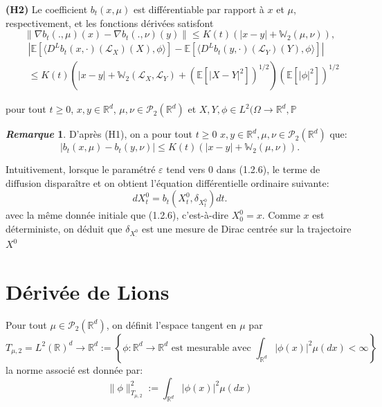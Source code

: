 \documentclass[12pt,a4paper,twoside]{book}%
\theoremstyle{definition}
\newtheorem{rem}{\textit{Remarque}}[section]
\numberwithin{equation}{section}
\begin{document}
\textbf{(H2)} Le coefficient $b_t(x, \mu)$ est différentiable par rapport à $x$ et $\mu$, respectivement, et les fonctions dérivées satisfont
\begin{equation}
	\|\nabla b_t(., \mu)(x) - \nabla b_t(., \nu)(y)\| \leq K(t)(|x - y| + \mathbb{W}_2(\mu, \nu)),
\end{equation}
\[
\begin{aligned}
	&\left| \mathbb{E}\left[ \langle D^L b_t(x, \cdot)(\mathcal{L}_X)(X), \phi \rangle \right] 
	- \mathbb{E}\left[ \langle D^L b_t(y, \cdot)(\mathcal{L}_Y)(Y), \phi \rangle \right] \right| \\
	&\leq K(t)\left( |x - y| + \mathbb{W}_2(\mathcal{L}_X, \mathcal{L}_Y) + \left( \mathbb{E}[|X - Y|^2] \right)^{1/2} \right) \left( \mathbb{E}[|\phi|^2] \right)^{1/2}
\end{aligned}
\]

pour tout $t \geq 0$, $x, y \in \mathbb{R}^d$, $\mu, \nu \in \mathcal{P}_2(\mathbb{R}^d)$ et $X, Y, \phi \in L^2(\Omega \to \mathbb{R}^d, \mathbb{P}$
\begin{rem}
	D'après (H1), on a pour tout $t\geq0$ $x,y\in\mathbb{R}^d,\mu,\nu\in\mathcal{P}_2(\mathbb{R}^d)$ que:
	\begin{equation}
		|b_t(x, \mu) - b_t(y, \nu)| \leq K(t)(|x - y| + \mathbb{W}_2(\mu, \nu)).
	\end{equation}
\end{rem}

Intuitivement, lorsque le paramétré $\varepsilon$ tend vers 0 dans (1.2.6), le terme de diffusion disparaître et on obtient l'équation différentielle ordinaire suivante:
\begin{equation}
	dX_t^0=b_t(X^0_t,\delta_{X_t^0})dt.
\end{equation}
avec la même donnée initiale que (1.2.6), c'est-à-dire $X_0^0=x$. Comme $x$ est déterministe, on déduit que $\delta_{X^0_\cdot}$ est une mesure de Dirac centrée sur la trajectoire $X^0$
\section{Dérivée de Lions}
Pour tout $\mu\in\mathcal{P}_2(\mathbb{R}^d)$, on définit l'espace tangent en $\mu$ par
\[
T_{\mu,2} = L^2(\mathbb{R})^d\longrightarrow \mathbb{R}^d :=\left\{\phi:\mathbb{R}^d\longrightarrow\mathbb{R}^d \text{ est mesurable avec }\int_{\mathbb{R}^d}|\phi(x)|^2\mu(dx)<\infty\right\}
\]
la norme associé est donnée par:
\[
\|\phi\|^2_{T_{\mu,2}}:=\int_{\mathbb{R}^d}|\phi(x)|^2\mu(dx)\] 
\end{document}
